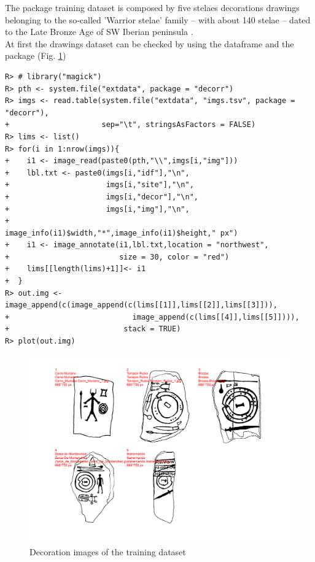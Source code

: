\documentclass[article]{jss}\usepackage{knitr}
\begin{document}
%
The  package training dataset is composed by five stelaes decorations drawings \citep{DiazGuardamino10} belonging to the so-called 'Warrior stelae' family -- with about 140 stelae -- dated to the Late Bronze Age of SW Iberian peninsula \citep{Celestino01}. \\
At first the drawings dataset can be checked by using the  dataframe and the  package (Fig. \ref{fig:timg})
%
\begin{kframe}
\begin{verbatim}
R> # library("magick")
R> pth <- system.file("extdata", package = "decorr")
R> imgs <- read.table(system.file("extdata", "imgs.tsv", package = "decorr"),
+                     sep="\t", stringsAsFactors = FALSE)
R> lims <- list()
R> for(i in 1:nrow(imgs)){
+    i1 <- image_read(paste0(pth,"\\",imgs[i,"img"]))
+    lbl.txt <- paste0(imgs[i,"idf"],"\n",
+                      imgs[i,"site"],"\n",
+                      imgs[i,"decor"],"\n",
+                      imgs[i,"img"],"\n",
+                      image_info(i1)$width,"*",image_info(i1)$height," px")
+    i1 <- image_annotate(i1,lbl.txt,location = "northwest",
+                         size = 30, color = "red")
+    lims[[length(lims)+1]]<- i1
+  }
R> out.img <- image_append(c(image_append(c(lims[[1]],lims[[2]],lims[[3]])),
+                            image_append(c(lims[[4]],lims[[5]]))),
+                          stack = TRUE)
R> plot(out.img)
\end{verbatim}
\end{kframe}\begin{figure}[H]

{\centering \includegraphics[width=\maxwidth]{figure/timg-1} 

}

\caption{\label{fig:figs}Decoration images of the training dataset}\label{fig:timg}
\end{figure}
\end{document}

